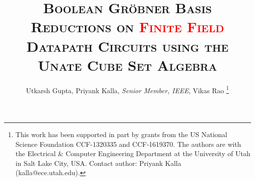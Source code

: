 \documentclass[10pt,twocolumn]{IEEEtran}
\newcommand{\ls}[1]
    {\dimen0=\fontdimen6\the\font
     \lineskip=#1\dimen0
     \advance\lineskip.5\fontdimen5\the\font
     \advance\lineskip-\dimen0
     \lineskiplimit=.9\lineskip
     \baselineskip=\lineskip
     \advance\baselineskip\dimen0
     \normallineskip\lineskip
     \normallineskiplimit\lineskiplimit
     \normalbaselineskip\baselineskip
     \ignorespaces
    }
\begin{document}



\title{\Large\textsc{Boolean Gr\"obner Basis Reductions on \textcolor{red}{Finite Field} Datapath Circuits using the Unate Cube Set Algebra}}
\author{Utkarsh Gupta, Priyank Kalla, {\it Senior Member, IEEE}, Vikas Rao 
\thanks{This work has been supported in part by grants from the US
  National Science Foundation CCF-1320335 and CCF-1619370. The authors
are with the Electrical \& Computer Engineering Department at the
University of Utah in Salt Lake City, USA. Contact author: Priyank
Kalla (kalla@ece.utah.edu).  }
}
 
 
\maketitle
\thispagestyle{empty}

\newcommand{\Fq}{{\mathbb{F}}_{q}}
\newcommand{\Fkk}{{\mathbb{F}}_{2^k}}
\newcommand{\Zkk}{{\mathbb{Z}}_{2^k}}
\newcommand{\Ftwo}{{\mathbb{F}}_{2}}
\newcommand{\Fkkx}[1][x]{\ensuremath{\mathbb{F}}_{2^k}[#1]\xspace}
\newcommand{\Grobner}{Gr\"{o}bner\xspace}
\newcommand{\B}{{\mathbb{B}}}
\newcommand{\Z}{{\mathbb{Z}}}
\newcommand{\F}{{\mathbb{F}}}
\newcommand{\G}{{\mathcal{G}}}
\newcommand{\alert}[1]{\textcolor{red}{#1}}

\newcommand{\spec}{{\it Spec}\xspace\ \xspace}

\newcommand{\debug}[1]{\textcolor{red}{[ #1 ]}}









\end{document}
